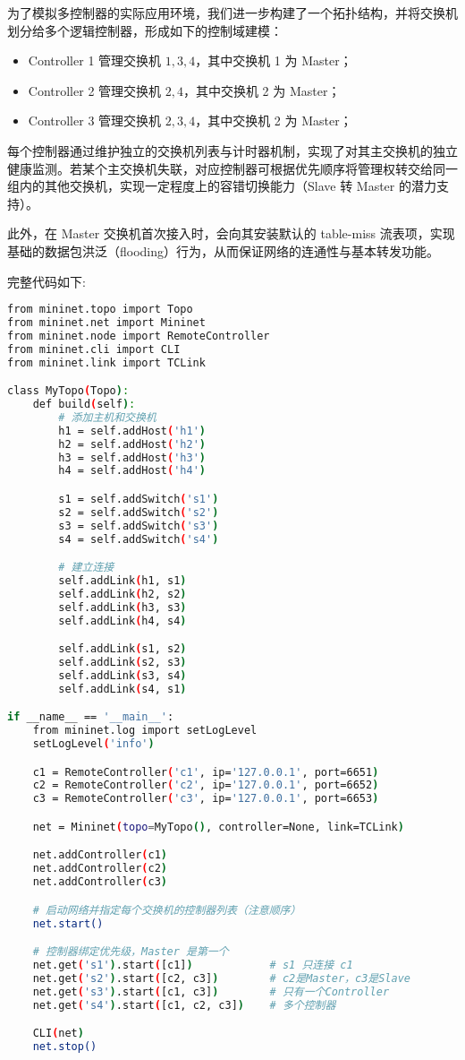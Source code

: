 \documentclass{article}
\begin{document}
为了模拟多控制器的实际应用环境，我们进一步构建了一个拓扑结构，并将交换机划分给多个逻辑控制器，形成如下的控制域建模：
\begin{itemize}
\item Controller 1 管理交换机 ${1, 3, 4}$，其中交换机 1 为 Master；
\item Controller 2 管理交换机 ${2, 4}$，其中交换机 2 为 Master；
\item Controller 3 管理交换机 ${2, 3, 4}$，其中交换机 2 为 Master；
\end{itemize}

 每个控制器通过维护独立的交换机列表与计时器机制，实现了对其主交换机的独立健康监测。若某个主交换机失联，对应控制器可根据优先顺序将管理权转交给同一组内的其他交换机，实现一定程度上的容错切换能力（Slave 转 Master 的潜力支持）。

 此外，在 Master 交换机首次接入时，会向其安装默认的 table-miss 流表项，实现基础的数据包洪泛（flooding）行为，从而保证网络的连通性与基本转发功能。

\noindent 完整代码如下:

\begin{lstlisting}[language=bash, caption={拓扑结构代码}]
from mininet.topo import Topo
from mininet.net import Mininet
from mininet.node import RemoteController
from mininet.cli import CLI
from mininet.link import TCLink

class MyTopo(Topo):
    def build(self):
        # 添加主机和交换机
        h1 = self.addHost('h1')
        h2 = self.addHost('h2')
        h3 = self.addHost('h3')
        h4 = self.addHost('h4')

        s1 = self.addSwitch('s1')
        s2 = self.addSwitch('s2')
        s3 = self.addSwitch('s3')
        s4 = self.addSwitch('s4')

        # 建立连接
        self.addLink(h1, s1)
        self.addLink(h2, s2)
        self.addLink(h3, s3)
        self.addLink(h4, s4)

        self.addLink(s1, s2)
        self.addLink(s2, s3)
        self.addLink(s3, s4)
        self.addLink(s4, s1)

if __name__ == '__main__':
    from mininet.log import setLogLevel
    setLogLevel('info')

    c1 = RemoteController('c1', ip='127.0.0.1', port=6651)
    c2 = RemoteController('c2', ip='127.0.0.1', port=6652)
    c3 = RemoteController('c3', ip='127.0.0.1', port=6653)

    net = Mininet(topo=MyTopo(), controller=None, link=TCLink)

    net.addController(c1)
    net.addController(c2)
    net.addController(c3)

    # 启动网络并指定每个交换机的控制器列表（注意顺序）
    net.start()

    # 控制器绑定优先级，Master 是第一个
    net.get('s1').start([c1])            # s1 只连接 c1
    net.get('s2').start([c2, c3])        # c2是Master，c3是Slave
    net.get('s3').start([c1, c3])        # 只有一个Controller
    net.get('s4').start([c1, c2, c3])    # 多个控制器

    CLI(net)
    net.stop()
\end{lstlisting}
\end{document}
